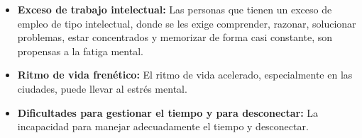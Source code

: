 \begin{itemize}
   

    \item \textbf{Exceso de trabajo intelectual:} Las personas que tienen un exceso de empleo de tipo intelectual, donde se les exige comprender, razonar, solucionar problemas, estar concentrados y memorizar de forma casi constante, son propensas a la fatiga mental.

    \item \textbf{Ritmo de vida frenético:} El ritmo de vida acelerado, especialmente en las ciudades, puede llevar al estrés mental.

    \item \textbf{Dificultades para gestionar el tiempo y para desconectar:} La incapacidad para manejar adecuadamente el tiempo y desconectar.


\end{itemize}



















